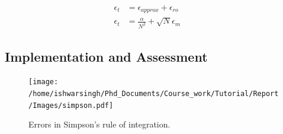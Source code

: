 \documentclass[a4,12pt]{article}
\numberwithin{equation}{subsection}
\begin{document}
\begin{align}
\epsilon_{t} &= \epsilon_{approx} + \epsilon_{ro} && \\
   \epsilon_{t}& = \frac{\alpha}{N^{\beta}} + \sqrt N \epsilon_m &&  
\end{align}

\subsection{Implementation and Assessment}

\begin{figure}[h]
    \centering
    \texttt{[image: /home/ishwarsingh/Phd\_Documents/Course\_work/Tutorial/Report/Images/simpson.pdf]}
  \caption{Errors in Simpson's rule of integration.}
  \label{fig:simpson}
\end{figure}
\end{document}
